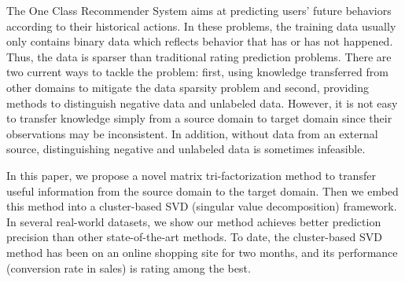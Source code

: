 The One Class Recommender System aims at predicting users’ future behaviors according to their historical actions. In these problems, the training data usually only contains binary data which reflects behavior that has or has not happened. Thus, the data is sparser than traditional rating prediction problems. There are two current ways to tackle the problem: first, using knowledge transferred from other domains to mitigate the data sparsity problem and second, providing methods to distinguish negative data and unlabeled data. However, it is not easy to transfer knowledge simply from a source domain to target domain since their observations may be inconsistent. In addition, without data from an external source, distinguishing negative and unlabeled data is sometimes infeasible.

In this paper, we propose a novel matrix tri-factorization method to transfer useful information from the source domain to the target domain. Then we embed this method into a cluster-based SVD (singular value decomposition) framework. In several real-world datasets, we show our method achieves better prediction precision than other state-of-the-art methods. To date, the cluster-based SVD method has been on an online shopping site for two months, and its performance (conversion rate in sales) is rating among the best.

